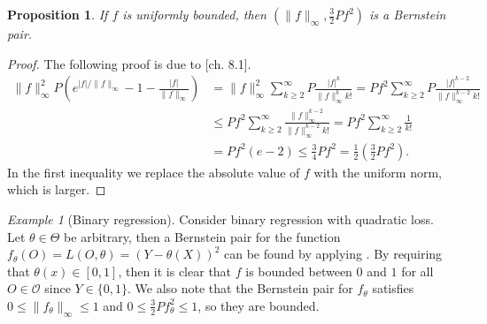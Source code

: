 \documentclass[11pt, a4paper]{article}
\newtheorem{proposition}[theorem]{Proposition}
\theoremstyle{definition}
\theoremstyle{remark}
\newtheorem{example}{Example}
\newcommand\norm[1]{\lVert#1\rVert}
\newcommand{\btheta}{\theta}
\begin{document}
\begin{proposition} \label{unifbernstein}
    If $ f $ is uniformly bounded, then $ (\norm{f}_{\infty}, \frac{3}{2} Pf^2 ) $ is a Bernstein pair. 
\end{proposition}
\begin{proof}
    The following proof is due to \parencite{vaart06}[ch. 8.1]. 
    \begin{align*}
        \norm{f}_{\infty}^2 P\left( e^{|f|/\norm{f}_{\infty}} -1 - \frac{|f|}{\norm{f}_{\infty}}\right) &= \norm{f}_{\infty}^{2} \sum_{k \geq 2}^{\infty} P \frac{|f|^{k}}{\norm{f}^{k}_{\infty}k!} = Pf^2 \sum_{k \geq 2}^{\infty} P\frac{|f|^{k-2}}{\norm{f}^{k-2}_{\infty} k! } \\
                                                                                                        &\leq P f^2 \sum_{k \geq 2}^{\infty} \frac{\norm{f}_{\infty}^{k-2}}{\norm{f}^{k-2}_{\infty} k! } = P f^2 \sum_{k \geq 2}^{\infty} \frac{1}{k !}\\
                                                                                                        &= P f^2 (e-2)\leq \frac{3}{4} P f^2 = \frac{1}{2} \left(\frac{3}{2} Pf^2\right). 
    \end{align*}
   In the first inequality we replace the absolute value of $ f $ with the uniform norm, which is larger. 
\end{proof}

\begin{example}[Binary regression] \label{ex:bernsteinexample}
    Consider binary regression with quadratic loss. Let $ \btheta \in \Theta $ be arbitrary, then a Bernstein pair for the function $ f_{\btheta}(O) = L(O, \btheta) = (Y - \theta(X))^2$ can be found by applying . By requiring that $ \theta(x) \in [0,1] $, then it is clear that $ f $ is bounded between $ 0 $ and $ 1 $ for all $ O \in \mathcal{O} $ since $ Y \in \{0,1\} $. We also note that the Bernstein pair for $ f_{\btheta} $ satisfies $ 0 \leq \norm{f_\theta}_{\infty} \leq 1 $ and $ 0 \leq \frac{3}{2}Pf_{\btheta}^2 \leq 1 $, so they are bounded. 

\end{example}
\end{document}
